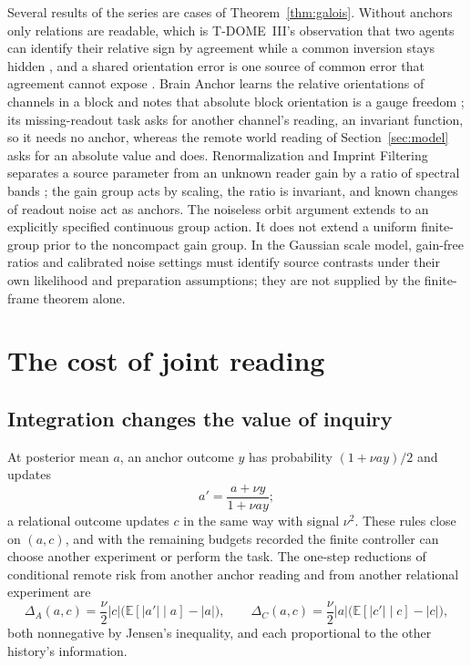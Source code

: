 \documentclass[11pt,a4paper]{article}
\newcommand{\E}{\mathbb E}
\begin{document}
Several results of the series are cases of Theorem~\ref{thm:galois}. Without anchors only relations are readable, which is T-DOME~III's observation that two agents can identify their relative sign by agreement while a common inversion stays hidden \cite{TDOMEIII}, and a shared orientation error is one source of common error that agreement cannot expose \cite{FoundationII}. Brain Anchor learns the relative orientations of channels in a block and notes that absolute block orientation is a gauge freedom \cite{BrainAnchor}; its missing-readout task asks for another channel's reading, an invariant function, so it needs no anchor, whereas the remote world reading of Section~\ref{sec:model} asks for an absolute value and does. Renormalization and Imprint Filtering separates a source parameter from an unknown reader gain by a ratio of spectral bands \cite{ImprintRG}; the gain group acts by scaling, the ratio is invariant, and known changes of readout noise act as anchors. The noiseless orbit argument extends to an explicitly specified continuous group action. It does not extend a uniform finite-group prior to the noncompact gain group. In the Gaussian scale model, gain-free ratios and calibrated noise settings must identify source contrasts under their own likelihood and preparation assumptions; they are not supplied by the finite-frame theorem alone.

\section{The cost of joint reading}\label{sec:cost}

\subsection{Integration changes the value of inquiry}\label{sec:inquiry}

At posterior mean $a$, an anchor outcome $y$ has probability $(1+\nu ay)/2$ and updates
\begin{equation}\label{eq:update}
 a'=\frac{a+\nu y}{1+\nu ay};
\end{equation}
a relational outcome updates $c$ in the same way with signal $\nu^2$. These rules close on $(a,c)$, and with the remaining budgets recorded the finite controller can choose another experiment or perform the task. The one-step reductions of conditional remote risk from another anchor reading and from another relational experiment are
\[
 \Delta_A(a,c)=\frac\nu2|c|\bigl(\E[|a'|\mid a]-|a|\bigr),\qquad
 \Delta_C(a,c)=\frac\nu2|a|\bigl(\E[|c'|\mid c]-|c|\bigr),
\]
both nonnegative by Jensen's inequality, and each proportional to the other history's information.
\end{document}
